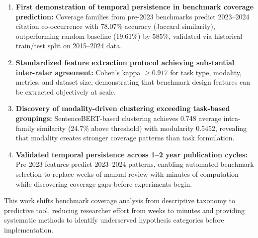 \begin{enumerate}
\item \textbf{First demonstration of temporal persistence in benchmark coverage prediction:} Coverage families from pre-2023 benchmarks predict 2023--2024 citation co-occurrence with 78.07\% accuracy (Jaccard similarity), outperforming random baseline (19.61\%) by 585\%, validated via historical train/test split on 2015--2024 data.

\item \textbf{Standardized feature extraction protocol achieving substantial inter-rater agreement:} Cohen's kappa $\geq 0.917$ for task type, modality, metrics, and dataset size, demonstrating that benchmark design features can be extracted objectively at scale.

\item \textbf{Discovery of modality-driven clustering exceeding task-based groupings:} SentenceBERT-based clustering achieves 0.748 average intra-family similarity (24.7\% above threshold) with modularity 0.5452, revealing that modality creates stronger coverage patterns than task formulation.

\item \textbf{Validated temporal persistence across 1--2 year publication cycles:} Pre-2023 features predict 2023--2024 patterns, enabling automated benchmark selection to replace weeks of manual review with minutes of computation while discovering coverage gaps before experiments begin.
\end{enumerate}

This work shifts benchmark coverage analysis from descriptive taxonomy to predictive tool, reducing researcher effort from weeks to minutes and providing systematic methods to identify underserved hypothesis categories before implementation.
